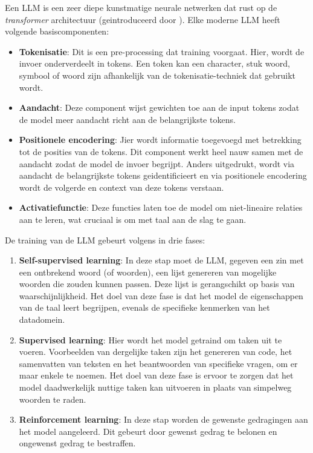 Een LLM is een zeer diepe kunstmatige neurale netwerken dat rust op de \textit{transformer} architectuur (geintroduceerd door \textcite{Vaswani2017}). Elke moderne LLM heeft volgende basiscomponenten:
\begin{itemize} 
    \item \textbf{Tokenisatie}: Dit is een pre-processing dat training voorgaat. Hier, wordt de invoer onderverdeelt in tokens. Een token kan een character, stuk woord, symbool of woord zijn afhankelijk van de tokenisatie-techniek dat gebruikt wordt. 
    \item \textbf{Aandacht}: Deze component wijst gewichten toe aan de input tokens zodat de model meer aandacht richt aan de belangrijkste tokens.
    \item \textbf{Positionele encodering}: Jier wordt informatie toegevoegd met betrekking tot de posities van de tokens. Dit component werkt heel nauw samen met de aandacht zodat de model de invoer begrijpt. Anders uitgedrukt, wordt via aandacht de belangrijkste tokens geidentificieert en via positionele encodering wordt de volgerde en context van deze tokens verstaan.
    \item \textbf{Activatiefunctie}: Deze functies laten toe de model om niet-lineaire relaties aan te leren, wat cruciaal is om met taal aan de slag te gaan.
\end{itemize}

De training van de LLM gebeurt volgens \textcite{Bach2024} in drie fases:
\begin{enumerate} 
    \item \textbf{Self-supervised learning}: In deze stap moet de LLM, gegeven een zin met een ontbrekend woord (of woorden), een lijst genereren van mogelijke woorden die zouden kunnen passen. Deze lijst is gerangschikt op basis van waarschijnlijkheid. Het doel van deze fase is dat het model de eigenschappen van de taal leert begrijpen, evenals de specifieke kenmerken van het datadomein.
    \item \textbf{Supervised learning}: Hier wordt het model getraind om taken uit te voeren. Voorbeelden van dergelijke taken zijn het genereren van code, het samenvatten van teksten en het beantwoorden van specifieke vragen, om er maar enkele te noemen. Het doel van deze fase is ervoor te zorgen dat het model daadwerkelijk nuttige taken kan uitvoeren in plaats van simpelweg woorden te raden.
    \item \textbf{Reinforcement learning}: In deze stap worden de gewenste gedragingen aan het model aangeleerd. Dit gebeurt door gewenst gedrag te belonen en ongewenst gedrag te bestraffen.
\end{enumerate}

